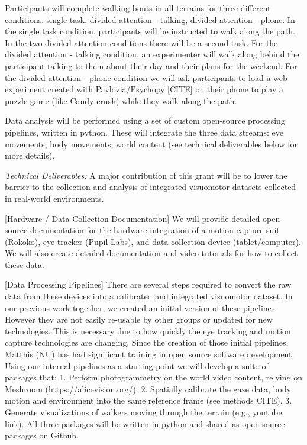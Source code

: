Participants will complete walking bouts in all terrains for three
different conditions: single task, divided attention - talking, divided
attention - phone. In the single task condition, participants will be
instructed to walk along the path. In the two divided attention
conditions there will be a second task. For the divided attention -
talking condition, an experimenter will walk along behind the
participant talking to them about their day and their plans for the
weekend. For the divided attention - phone condition we will ask
participants to load a web experiment created with Pavlovia/Psychopy
{[}CITE{]} on their phone to play a puzzle game (like Candy-crush) while
they walk along the path.

Data analysis will be performed using a set of custom open-source
processing pipelines, written in python. These will integrate the three
data streams: eye movements, body movements, world content (see
technical deliverables below for more details).

\emph{Technical Deliverables:} A major contribution of this grant will
be to lower the barrier to the collection and analysis of integrated
visuomotor datasets collected in real-world environments.

{[}Hardware / Data Collection Documentation{]} We will provide detailed
open source documentation for the hardware integration of a motion
capture suit (Rokoko), eye tracker (Pupil Labs), and data collection
device (tablet/computer). We will also create detailed documentation and
video tutorials for how to collect these data.

{[}Data Processing Pipelines{]} There are several steps required to
convert the raw data from these devices into a calibrated and integrated
visuomotor dataset. In our previous work together, we created an initial
version of these pipelines. However they are not easily re-usable by
other groups or updated for new technologies. This is necessary due to
how quickly the eye tracking and motion capture technologies are
changing. Since the creation of those initial pipelines, Matthis (NU)
has had significant training in open source software development. Using
our internal pipelines as a starting point we will develop a suite of
packages that: 1. Perform photogrammetry on the world video content,
relying on Meshroom (https://alicevision.org/). 2. Spatially calibrate
the gaze data, body motion and environment into the same reference frame
(see methods CITE). 3. Generate visualizations of walkers moving through
the terrain (e.g., youtube link). All three packages will be written in
python and shared as open-source packages on Github.

